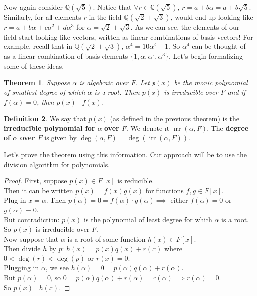 \documentclass[11pt]{amsart}
\newtheorem{theorem}{Theorem}[section]
\theoremstyle{definition}
\newtheorem{definition}[theorem]{Definition}
\newcommand{\rationals}{\mathbb{Q}}
\DeclareMathOperator{\irr}{irr}
\begin{document}
Now again consider $\rationals(\sqrt{5})$. Notice that $\forall r \in \rationals(\sqrt{5})$, $r = a + b\alpha = a + b\sqrt{5}$. Similarly, for all elements
$r$ in the field $\rationals(\sqrt{2} + \sqrt{3})$, would end up looking like $r = a + b\alpha + c\alpha^2 + d\alpha^3$ for 
$\alpha = \sqrt{2} + \sqrt{3}$. As we can see, the elements of our field start looking like vectors, written as linear combinations of basis vectors!
For example, recall that in $\rationals(\sqrt{2} + \sqrt{3})$, $\alpha^4 = 10\alpha^2 - 1$. So $\alpha^4$ can be thought of as a linear combination
of basis elements $\{ 1, \alpha, \alpha^2, \alpha^3 \}$. Let's begin formalizing some of these ideas.
\begin{theorem}
	Suppose $\alpha$ is algebraic over $F$. Let $p(x)$ be the monic polynomial of smallest degree of which $\alpha$ is a root. Then $p(x)$
	is irreducible over $F$ and if $f(\alpha) = 0$, then $p(x) \mid f(x)$.
\end{theorem}
\begin{definition}
	We say that $p(x)$ (as defined in the previous theorem) is the \textbf{irreducible polynomial for $\alpha$ over $F$}. We denote it 
	$\irr(\alpha, F)$. The \textbf{degree of $\alpha$ over $F$} is given by $\deg(\alpha, F) = \deg(\irr(\alpha, F))$.
\end{definition}
Let's prove the theorem using this information. Our approach will be to use the division algorithm for polynomials.
\begin{proof}
	First, suppose $p(x) \in F[x]$ is reducible. \\
	Then it can be written $p(x) = f(x)g(x)$ for functions $f, g \in F[x]$. \\
	Plug in $x = \alpha$. Then $p(\alpha) = 0 = f(\alpha) \cdot g(\alpha) \implies$ either $f(\alpha) = 0$ or $g(\alpha) = 0$. \\
	But contradiction: $p(x)$ is the polynomial of least degree for which $\alpha$ is a root. \\
	So $p(x)$ is irreducible over $F$. \\
	Now suppose that $\alpha$ is a root of some function $h(x) \in F[x]$. \\
	Then divide $h$ by $p$: $h(x) = p(x)q(x) + r(x)$ where $0 < \deg(r) < \deg(p)$ or $r(x) = 0$. \\
	Plugging in $\alpha$, we see $h(\alpha) = 0 = p(\alpha)q(\alpha) + r(\alpha)$. \\
	But $p(\alpha) = 0$, so $0 = p(\alpha)q(\alpha) + r(\alpha) = r(\alpha) \implies r(\alpha) = 0$. \\
	So $p(x) \mid h(x)$.
\end{proof}
\end{document}
